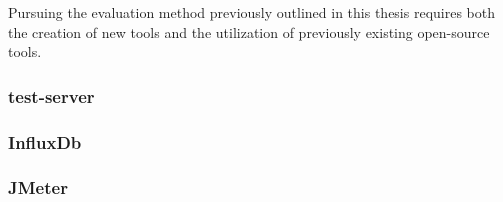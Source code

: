 Pursuing the evaluation method previously outlined in this thesis requires both
the creation of new tools and the utilization of previously existing open-source
tools.

\subsubsection{test-server}



\subsubsection{InfluxDb}



\subsubsection{JMeter}





